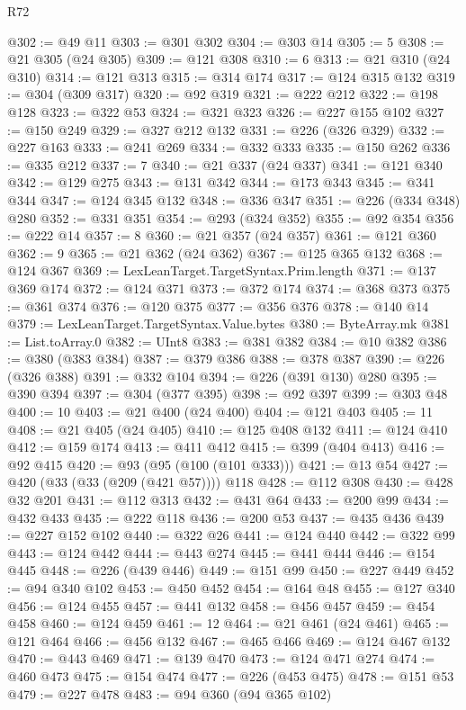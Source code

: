 \begin{lexlean}{R72}
\begin{coremodule}
@302 := @49 @11
@303 := @301 @302
@304 := @303 @14
@305 := 5
@308 := @21 @305 (@24 @305)
@309 := @121 @308
@310 := 6
@313 := @21 @310 (@24 @310)
@314 := @121 @313
@315 := @314 @174
@317 := @124 @315 @132
@319 := @304 (@309 @317)
@320 := @92 @319
@321 := @222 @212
@322 := @198 @128
@323 := @322 @53
@324 := @321 @323
@326 := @227 @155 @102
@327 := @150 @249
@329 := @327 @212 @132
@331 := @226 (@326 @329)
@332 := @227 @163
@333 := @241 @269
@334 := @332 @333
@335 := @150 @262
@336 := @335 @212
@337 := 7
@340 := @21 @337 (@24 @337)
@341 := @121 @340
@342 := @129 @275
@343 := @131 @342
@344 := @173 @343
@345 := @341 @344
@347 := @124 @345 @132
@348 := @336 @347
@351 := @226 (@334 @348) @280
@352 := @331 @351
@354 := @293 (@324 @352)
@355 := @92 @354
@356 := @222 @14
@357 := 8
@360 := @21 @357 (@24 @357)
@361 := @121 @360
@362 := 9
@365 := @21 @362 (@24 @362)
@367 := @125 @365 @132
@368 := @124 @367
@369 := LexLeanTarget.TargetSyntax.Prim.length
@371 := @137 @369 @174
@372 := @124 @371
@373 := @372 @174
@374 := @368 @373
@375 := @361 @374
@376 := @120 @375
@377 := @356 @376
@378 := @140 @14
@379 := LexLeanTarget.TargetSyntax.Value.bytes
@380 := ByteArray.mk
@381 := List.toArray.{0}
@382 := UInt8
@383 := @381 @382
@384 := @10 @382
@386 := @380 (@383 @384)
@387 := @379 @386
@388 := @378 @387
@390 := @226 (@326 @388)
@391 := @332 @104
@394 := @226 (@391 @130) @280
@395 := @390 @394
@397 := @304 (@377 @395)
@398 := @92 @397
@399 := @303 @48
@400 := 10
@403 := @21 @400 (@24 @400)
@404 := @121 @403
@405 := 11
@408 := @21 @405 (@24 @405)
@410 := @125 @408 @132
@411 := @124 @410
@412 := @159 @174
@413 := @411 @412
@415 := @399 (@404 @413)
@416 := @92 @415
@420 := @93 (@95 (@100 (@101 @333)))
@421 := @13 @54
@427 := @420 (@33 (@33 (@209 (@421 @57)))) @118
@428 := @112 @308
@430 := @428 @32 @201
@431 := @112 @313
@432 := @431 @64
@433 := @200 @99
@434 := @432 @433
@435 := @222 @118
@436 := @200 @53
@437 := @435 @436
@439 := @227 @152 @102
@440 := @322 @26
@441 := @124 @440
@442 := @322 @99
@443 := @124 @442
@444 := @443 @274
@445 := @441 @444
@446 := @154 @445
@448 := @226 (@439 @446)
@449 := @151 @99
@450 := @227 @449
@452 := @94 @340 @102
@453 := @450 @452
@454 := @164 @48
@455 := @127 @340
@456 := @124 @455
@457 := @441 @132
@458 := @456 @457
@459 := @454 @458
@460 := @124 @459
@461 := 12
@464 := @21 @461 (@24 @461)
@465 := @121 @464
@466 := @456 @132
@467 := @465 @466
@469 := @124 @467 @132
@470 := @443 @469
@471 := @139 @470
@473 := @124 @471 @274
@474 := @460 @473
@475 := @154 @474
@477 := @226 (@453 @475)
@478 := @151 @53
@479 := @227 @478
@483 := @94 @360 (@94 @365 @102)

\end{coremodule}
\end{lexlean}
